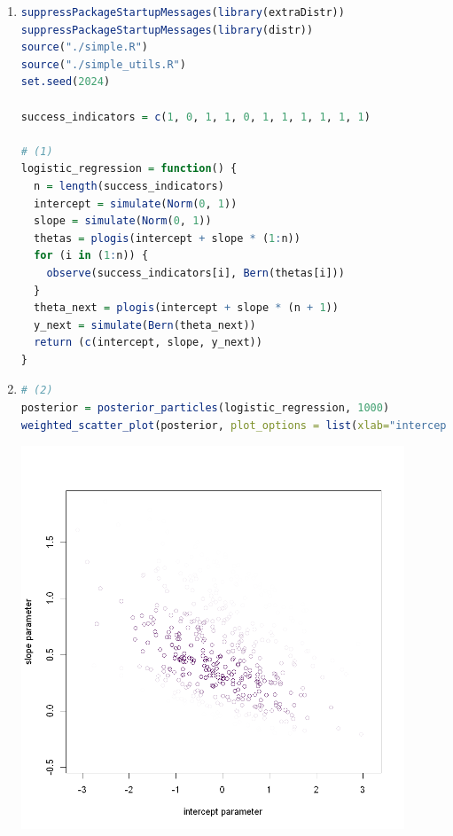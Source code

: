 \documentclass{article}
\begin{document}



\begin{enumerate}
\item 
\begin{lstlisting}[language=R]
suppressPackageStartupMessages(library(extraDistr))
suppressPackageStartupMessages(library(distr))
source("./simple.R")
source("./simple_utils.R")
set.seed(2024)

success_indicators = c(1, 0, 1, 1, 0, 1, 1, 1, 1, 1, 1)

# (1)
logistic_regression = function() {
  n = length(success_indicators)
  intercept = simulate(Norm(0, 1))
  slope = simulate(Norm(0, 1))
  thetas = plogis(intercept + slope * (1:n))
  for (i in (1:n)) {
    observe(success_indicators[i], Bern(thetas[i]))
  } 
  theta_next = plogis(intercept + slope * (n + 1))
  y_next = simulate(Bern(theta_next))
  return (c(intercept, slope, y_next))
}
\end{lstlisting}



\item \begin{lstlisting}[language=R]
# (2)
posterior = posterior_particles(logistic_regression, 1000)
weighted_scatter_plot(posterior, plot_options = list(xlab="intercept parameter", ylab="slope parameter"))
\end{lstlisting}
\includegraphics[width=0.9\textwidth]{int_slope.png}




\end{enumerate}
\end{document}
